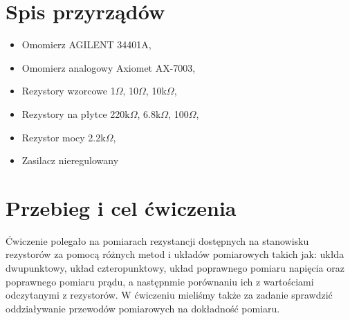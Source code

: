{\section{Spis przyrządów}}

\begin{itemize}
    \item Omomierz AGILENT 34401A,
    \item Omomierz analogowy Axiomet AX-7003,
    \item Rezystory wzorcowe 1$\Omega$, 10$\Omega$, 10k$\Omega$,
    \item Rezystory na płytce 220k$\Omega$, 6.8k$\Omega$, 100$\Omega$,
    \item Rezystor mocy 2.2k$\Omega$,
    \item Zasilacz nieregulowany
\end{itemize}

{\section{Przebieg i cel ćwiczenia}}

Ćwiczenie polegało na pomiarach rezystancji dostępnych na stanowisku rezystorów za pomocą różnych metod i układów pomiarowych takich jak: ukłda dwupunktowy, układ czteropunktowy, układ poprawnego pomiaru napięcia oraz poprawnego pomiaru prądu, a następnmie porównaniu ich z wartościami odczytanymi z rezystorów. W ćwiczeniu mieliśmy także za zadanie sprawdzić oddziaływanie przewodów pomiarowych na dokładność pomiaru. \\
